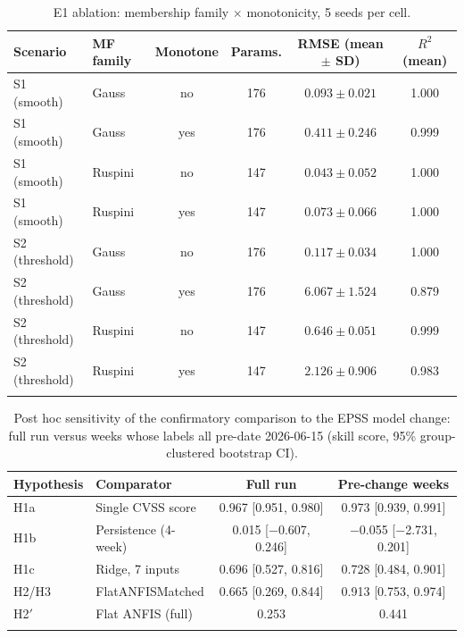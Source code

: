 \documentclass[pdflatex,sn-basic]{sn-jnl}
\theoremstyle{thmstyleone}%
\theoremstyle{thmstyletwo}%
\theoremstyle{thmstylethree}%
\begin{document}
\begin{table}[h]
\caption{E1 ablation: membership family $\times$ monotonicity, 5 seeds per cell.}\label{tab:e1-ablation}
\begin{tabular}{@{}llcccc@{}}
\toprule
Scenario & MF family & Monotone & Params. & RMSE (mean $\pm$ SD) & $R^2$ (mean) \\
\midrule
S1 (smooth)     & Gauss   & no  & 176 & $0.093\pm0.021$ & 1.000 \\
S1 (smooth)     & Gauss   & yes & 176 & $0.411\pm0.246$ & 0.999 \\
S1 (smooth)     & Ruspini & no  & 147 & $0.043\pm0.052$ & 1.000 \\
S1 (smooth)     & Ruspini & yes & 147 & $0.073\pm0.066$ & 1.000 \\
S2 (threshold)  & Gauss   & no  & 176 & $0.117\pm0.034$ & 1.000 \\
S2 (threshold)  & Gauss   & yes & 176 & $6.067\pm1.524$ & 0.879 \\
S2 (threshold)  & Ruspini & no  & 147 & $0.646\pm0.051$ & 0.999 \\
S2 (threshold)  & Ruspini & yes & 147 & $2.126\pm0.906$ & 0.983 \\
\botrule
\end{tabular}
\end{table}

\begin{table}[h]
\caption{Post hoc sensitivity of the confirmatory comparison to the EPSS model change: full run versus weeks
whose labels all pre-date 2026-06-15 (skill score, 95\% group-clustered bootstrap CI).}\label{tab:e4-epss}
\begin{tabular}{@{}llcc@{}}
\toprule
Hypothesis & Comparator & Full run & Pre-change weeks \\
\midrule
H1a & Single CVSS score & 0.967 [0.951, 0.980] & 0.973 [0.939, 0.991] \\
H1b & Persistence (4-week) & 0.015 [$-$0.607, 0.246] & $-$0.055 [$-$2.731, 0.201] \\
H1c & Ridge, 7 inputs & 0.696 [0.527, 0.816] & 0.728 [0.484, 0.901] \\
H2/H3 & FlatANFISMatched & 0.665 [0.269, 0.844] & 0.913 [0.753, 0.974] \\
H2$'$ & Flat ANFIS (full) & 0.253 & 0.441 \\
\botrule
\end{tabular}
\end{table}
\end{document}
